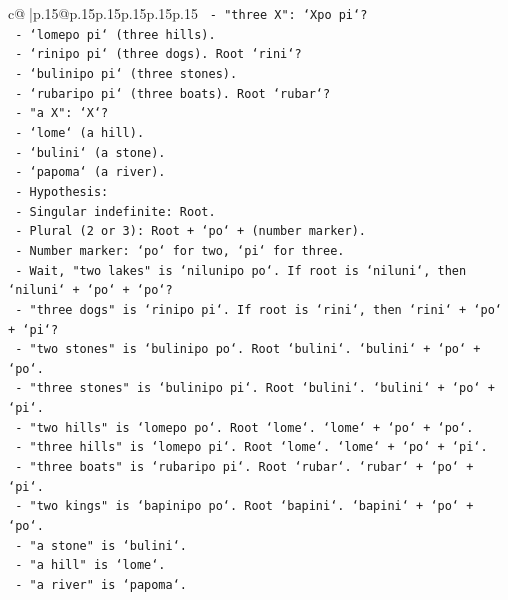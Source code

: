 \documentclass{article}
\begin{document}
{\begin{supertabular}{c@{$\;$}|p{.15\linewidth}@{}p{.15\linewidth}p{.15\linewidth}p{.15\linewidth}p{.15\linewidth}p{.15\linewidth}}
{{{\texttt{            {-} "three X": `Xpo pi`?} \\
\texttt{              {-} `lomepo pi` (three hills).} \\
\texttt{              {-} `rinipo pi` (three dogs). Root `rini`?} \\
\texttt{              {-} `bulinipo pi` (three stones).} \\
\texttt{              {-} `rubaripo pi` (three boats). Root `rubar`?} \\
\texttt{            {-} "a X": `X`?} \\
\texttt{              {-} `lome` (a hill).} \\
\texttt{              {-} `bulini` (a stone).} \\
\texttt{              {-} `papoma` (a river).} \\
\texttt{          {-} Hypothesis:} \\
\texttt{            {-} Singular indefinite: Root.} \\
\texttt{            {-} Plural (2 or 3): Root + `po` + (number marker).} \\
\texttt{            {-} Number marker: `po` for two, `pi` for three.} \\
\texttt{            {-} Wait, "two lakes" is `nilunipo po`. If root is `niluni`, then `niluni` + `po` + `po`?} \\
\texttt{            {-} "three dogs" is `rinipo pi`. If root is `rini`, then `rini` + `po` + `pi`?} \\
\texttt{            {-} "two stones" is `bulinipo po`. Root `bulini`. `bulini` + `po` + `po`.} \\
\texttt{            {-} "three stones" is `bulinipo pi`. Root `bulini`. `bulini` + `po` + `pi`.} \\
\texttt{            {-} "two hills" is `lomepo po`. Root `lome`. `lome` + `po` + `po`.} \\
\texttt{            {-} "three hills" is `lomepo pi`. Root `lome`. `lome` + `po` + `pi`.} \\
\texttt{            {-} "three boats" is `rubaripo pi`. Root `rubar`. `rubar` + `po` + `pi`.} \\
\texttt{            {-} "two kings" is `bapinipo po`. Root `bapini`. `bapini` + `po` + `po`.} \\
\texttt{            {-} "a stone" is `bulini`.} \\
\texttt{            {-} "a hill" is `lome`.} \\
\texttt{            {-} "a river" is `papoma`.} \\
}}}
\end{supertabular}}
\end{document}
